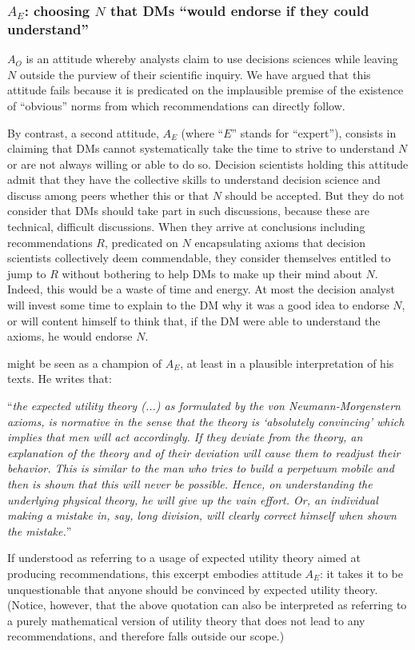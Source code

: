 \documentclass[preprint, french, english, 11pt, authoryear]{elsarticle}%
\newcommand{\protectforpdf}[1]{\texorpdfstring{\ensuremath{#1}}{#1}}
\begin{document}
\subsubsection{\texorpdfstring{$A_E$}{AE}: choosing \protectforpdf{N} that \acp{DM} “would endorse if they could understand”}
$A_O$ is an attitude whereby analysts claim to use decisions sciences while leaving $N$ outside the purview of their scientific inquiry. We have argued that this attitude fails because it is predicated on the implausible premise of the existence of “obvious” norms from which recommendations can directly follow.

By contrast, a second attitude, $A_E$ (where ``$E$'' stands for “expert”), consists in claiming that \acp{DM} cannot systematically take the time to strive to understand $N$ or are not always willing or able to do so. Decision scientists holding this attitude admit that they have the collective skills to understand decision science and discuss among peers whether this or that $N$ should be accepted. But they do not consider that \acp{DM} should take part in such discussions, because these are technical, difficult discussions. When they arrive at conclusions including recommendations $R$, predicated on $N$ encapsulating axioms that decision scientists collectively deem commendable, they consider themselves entitled to jump to $R$ without bothering to help \acp{DM} to make up their mind about $N$. Indeed, this would be a waste of time and energy. At most the decision analyst will invest some time to explain to the \ac{DM} why it was a good idea to endorse $N$, or will content himself to think that, if the \ac{DM} were able to understand the axioms, he would endorse $N$.

\citet[p. 180]{morgenstern_reflections_1979} might be seen as a champion of $A_E$, at least in a plausible interpretation of his texts. He writes that: 

\begin{addmargin}[3em]{3em}
“\emph{the expected utility theory (...) as formulated by the von Neumann-Morgenstern axioms, is normative in the sense that the theory is ‘absolutely convincing’ which implies that men will act accordingly. If they deviate from the theory, an explanation of the theory and of their deviation will cause them to readjust their behavior. This is similar to the man who tries to build a perpetuum mobile and then is shown that this will never be possible. Hence, on understanding the underlying physical theory, he will give up the vain effort. Or, an individual making a mistake in, say, long division, will clearly correct himself when shown the mistake.}” 
\end{addmargin}
If understood as referring to a usage of expected utility theory aimed at producing recommendations, this excerpt embodies attitude $A_E$: it takes it to be unquestionable that anyone should be convinced by expected utility theory. (Notice, however, that the above quotation can also be interpreted as referring to a purely mathematical version of utility theory that does not lead to any recommendations, and therefore falls outside our scope.)
\end{document}
